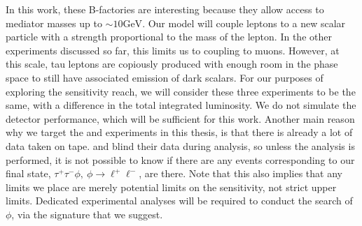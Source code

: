 In this work, these B-factories are interesting because they allow access to mediator masses up to $\sim 10\textrm{GeV}$.
Our model will couple leptons to a new scalar particle with a strength proportional to the mass of the lepton.
In the other experiments discussed so far, this limits us to coupling to muons.
However, at this scale, tau leptons are copiously produced with enough room in the phase space to still have associated emission of dark scalars.
For our purposes of exploring the sensitivity reach, we will consider these three experiments to be the same, with a difference in the total integrated luminosity.
We do not simulate the detector performance, which will be sufficient for this work.
Another main reason why we target the \babar and \belle experiments in this thesis, is that there is already a lot of data taken on tape.
\babar and \belle blind their data during analysis, so unless the analysis is performed, it is not possible to know if there are any events corresponding to our final state, $\tau^+ \tau^- \phi,~\phi \rightarrow \ell^+ \ell^-$, are there.
Note that this also implies that any limits we place are merely potential limits on the sensitivity, not strict upper limits.
Dedicated experimental analyses will be required to conduct the search of $\phi$, via the signature that we suggest.
